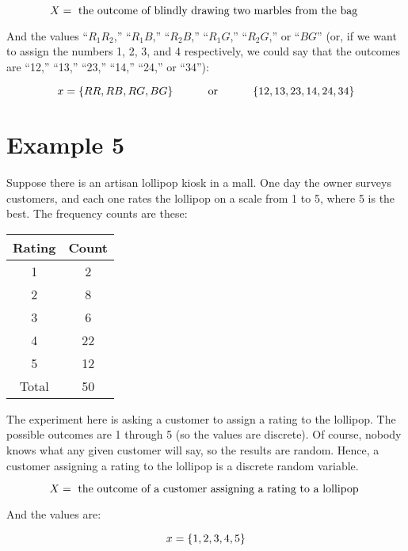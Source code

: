 \documentclass[../../../main.tex]{subfiles}
\begin{document}
\begin{equation*}
    \RandVar/ = \text{ the outcome of blindly drawing two marbles from the bag }
\end{equation*}

\noindent
And the values ``$R_{1}R_{2}$,'' ``$R_{1}B$,'' ``$R_{2}B$,'' ``$R_{1}G$,'' ``$R_{2}G$,'' or ``$BG$'' (or, if we want to assign the numbers 1, 2, 3, and 4 respectively, we could say that the outcomes are ``12,'' ``13,'' ``23,'' ``14,'' ``24,'' or ``34''):

\begin{equation*}
    \RandVarVal/ = \{ RR, RB, RG, BG \} \hskip 1cm \text{ or } \hskip 1cm \{ 12, 13, 23, 14, 24, 34 \}
\end{equation*}


\section{Example 5}

Suppose there is an artisan lollipop kiosk in a mall. One day the owner surveys customers, and each one rates the lollipop on a scale from 1 to 5, where 5 is the best. The frequency counts are these:

\begin{center}
  \begin{tabular}{| c | c |}
    \hline
    \textbf{Rating} & \textbf{Count} \\ \hline
    1 & 2 \\ \hline
    2 & 8 \\ \hline
    3 & 6 \\ \hline
    4 & 22 \\ \hline
    5 & 12 \\ \hline
    Total & 50 \\ \hline
  \end{tabular}
\end{center}

\noindent
The experiment here is asking a customer to assign a rating to the lollipop. The possible outcomes are 1 through 5 (so the values are discrete). Of course, nobody knows what any given customer will say, so the results are random. Hence, a customer assigning a rating to the lollipop is a discrete random variable.

\begin{equation*}
    \RandVar/ = \text{ the outcome of a customer assigning a rating to a lollipop }
\end{equation*}

\noindent
And the values are:

\begin{equation*}
    \RandVarVal/ = \{ 1, 2, 3, 4, 5 \}
\end{equation*}
\end{document}
